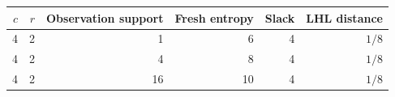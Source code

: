 \begin{tabular}{rrrrrr}
\toprule
$c$ & $r$ & Observation support & Fresh entropy & Slack & LHL distance \\
\midrule
4 & 2 & 1 & 6 & 4 & $1/8$ \\
4 & 2 & 4 & 8 & 4 & $1/8$ \\
4 & 2 & 16 & 10 & 4 & $1/8$ \\
\bottomrule
\end{tabular}
